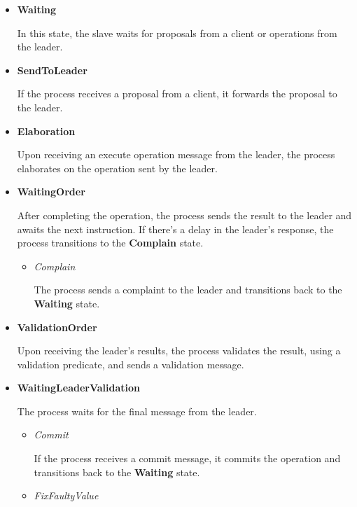 \documentclass{scrartcl}
\begin{document}
\begin{itemize}
    \item \textbf{Waiting}
    
    In this state, the slave waits for proposals from a client or operations from the leader.

    \item \textbf{SendToLeader}
    
    If the process receives a proposal from a client, it forwards the proposal to the leader.
    
    \item \textbf{Elaboration}
    
    Upon receiving an execute operation message from the leader, the process elaborates on the operation sent by the leader.
    
    \item \textbf{WaitingOrder}
    
    After completing the operation, the process sends the result to the leader and awaits the next instruction. If there's a delay in the leader's response, the process transitions to the \textbf{Complain} state.
    
    \begin{itemize}
        \item \textit{Complain}
        
        The process sends a complaint to the leader and transitions back to the \textbf{Waiting} state.
    \end{itemize}
    
    \item \textbf{ValidationOrder}
    
    Upon receiving the leader's results, the process validates the result, using a validation predicate, and sends a validation message.
    
    \item \textbf{WaitingLeaderValidation}
    
    The process waits for the final message from the leader.
    
    \begin{itemize}
        \item \textit{Commit}
        
        If the process receives a commit message, it commits the operation and transitions back to the \textbf{Waiting} state.
        
        \item \textit{FixFaultyValue}
        

\end{itemize}
\end{itemize}
\end{document}
